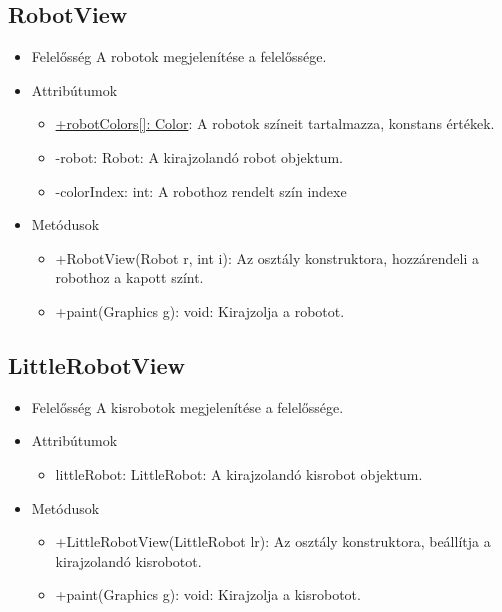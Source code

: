 \subsection{RobotView}
\begin{itemize}
	\item Felelősség\newline
	A robotok megjelenítése a felelőssége.
	
	\item Attribútumok
	\begin{itemize}
		\item \underline{+robotColors[]: Color}: A robotok színeit tartalmazza, konstans értékek. 
		\item -robot: Robot: A kirajzolandó robot objektum.
		\item -colorIndex: int: A robothoz rendelt szín indexe
	\end{itemize}
	\item Metódusok
	\begin{itemize}
		\item +RobotView(Robot r, int i): Az osztály konstruktora, hozzárendeli a robothoz a kapott színt.
		\item +paint(Graphics g): void: Kirajzolja a robotot.
	\end{itemize}
\end{itemize}

\subsection{LittleRobotView}
\begin{itemize}
	\item Felelősség\newline
	A kisrobotok megjelenítése a felelőssége.

	\item Attribútumok
	\begin{itemize}
		\item littleRobot: LittleRobot: A kirajzolandó kisrobot objektum.
		
	\end{itemize}
	\item Metódusok
	\begin{itemize}
		\item +LittleRobotView(LittleRobot lr): Az osztály konstruktora, beállítja a kirajzolandó kisrobotot.
		\item +paint(Graphics g): void: Kirajzolja a kisrobotot.
	\end{itemize}
\end{itemize}

